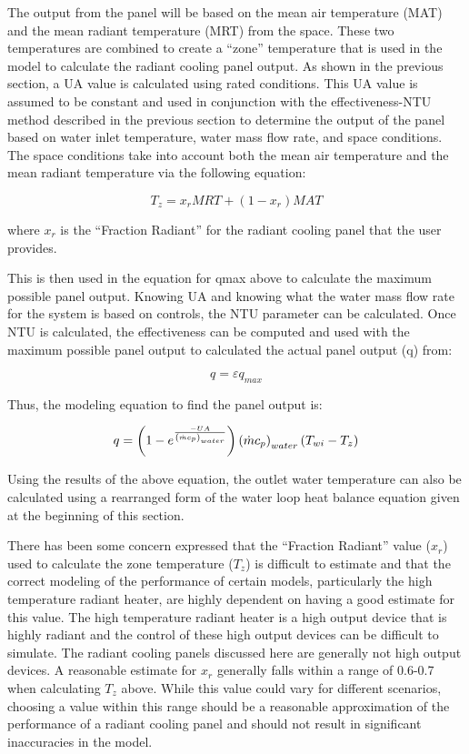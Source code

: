 The output from the panel will be based on the mean air temperature (MAT) and the mean radiant temperature (MRT) from the space.  These two temperatures are combined to create a “zone” temperature that is used in the model to calculate the radiant cooling panel output.  As shown in the previous section, a UA value is calculated using rated conditions.  This UA value is assumed to be constant and used in conjunction with the effectiveness-NTU method described in the previous section to determine the output of the panel based on water inlet temperature, water mass flow rate, and space conditions.  The space conditions take into account both the mean air temperature and the mean radiant temperature via the following equation:

\begin{equation}
T_z = x_r MRT+ ( 1-x_r ) MAT
\end{equation}

where \(x_r\) is the “Fraction Radiant” for the radiant cooling panel that the user provides.

This is then used in the equation for qmax above to calculate the maximum possible panel output.  Knowing UA and knowing what the water mass flow rate for the system is based on controls, the NTU parameter can be calculated.  Once NTU is calculated, the effectiveness can be computed and used with the maximum possible panel output to calculated the actual panel output (q) from:

\begin{equation}
q = \varepsilon {q_{max}}
\end{equation}

Thus, the modeling equation to find the panel output is:

\begin{equation}
q = \left(1-e^{\frac{-UA}{\left(\dot{m} c_p\right)_{water}}}\right) \left(\dot{m} c_p\right)_{water} \left({T}_{wi}-{T}_{z}\right)
\end{equation}

Using the results of the above equation, the outlet water temperature can also be calculated using a rearranged form of the water loop heat balance equation given at the beginning of this section.

There has been some concern expressed that the “Fraction Radiant” value (\(x_r\)) used to calculate the zone temperature (\(T_z\)) is difficult to estimate and that the correct modeling of the performance of certain models, particularly the high temperature radiant heater, are highly dependent on having a good estimate for this value.  The high temperature radiant heater is a high output device that is highly radiant and the control of these high output devices can be difficult to simulate.  The radiant cooling panels discussed here are generally not high output devices.  A reasonable estimate for \(x_r\) generally falls within a range of 0.6-0.7 when calculating \(T_z\) above.  While this value could vary for different scenarios, choosing a value within this range should be a reasonable approximation of the performance of a radiant cooling panel and should not result in significant inaccuracies in the model.

